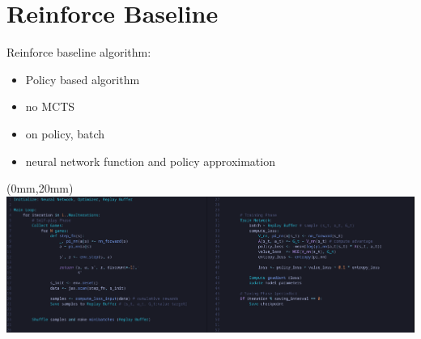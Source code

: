 \documentclass[aspectratio=169,xcolor=dvipsnames]{beamer}
\begin{document}
\section{Reinforce Baseline}

\begin{frame}{}
    Reinforce baseline algorithm:

    \medskip
    \begin{itemize}
    \item Policy based algorithm
    \item no MCTS
    \item on policy, batch
    \item neural network function and policy approximation
\end{itemize}
\end{frame}

\begin{frame}{}
    \begin{textblock*}{\paperwidth}(0mm,20mm) %
        \includegraphics[width=\paperwidth,height=\paperheight,keepaspectratio]{reinforce_algo.png}
    \end{textblock*}
\end{frame}
\end{document}
